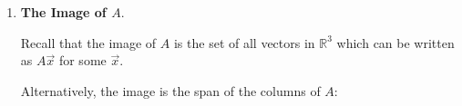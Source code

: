 \documentclass[12pt]{article}
\theoremstyle{definition}
\newtheorem{remark}{Remark}[section]
\theoremstyle{plain}
\begin{document}
\begin{enumerate}[label=(\alph*)]
Now, plugging \( x_3 = 0 \) back into the equation for \( x_1 \):
\[
x_1 = -2x_2 - 0 = -2x_2
\]

So, the solution set is:
\[
\vec{x} = 
\begin{pmatrix}
x_1 \\ x_2 \\ x_3
\end{pmatrix}
=
\begin{pmatrix}
-2x_2 \\ x_2 \\ 0
\end{pmatrix}
= 
x_2 \begin{pmatrix} -2 \\ 1 \\ 0 \end{pmatrix}
\]
where \( x_2 \in \mathbb{R} \).

\begin{center}
\end{center}

\begin{remark}
    This kernel consists of all vectors in \( \mathbb{R}^3 \) that are ``annihilated'' by \( A \); that is, they are precisely those inputs which are sent to the zero vector under this transformation.
\end{remark}

\item \textbf{The Image of \( A \)}.

Recall that the image of \( A \) is the set of all vectors in \( \mathbb{R}^3 \) which can be written as \( A\vec{x} \) for some \( \vec{x} \).

Alternatively, the image is the span of the columns of \( A \):


\end{enumerate}
\end{document}
